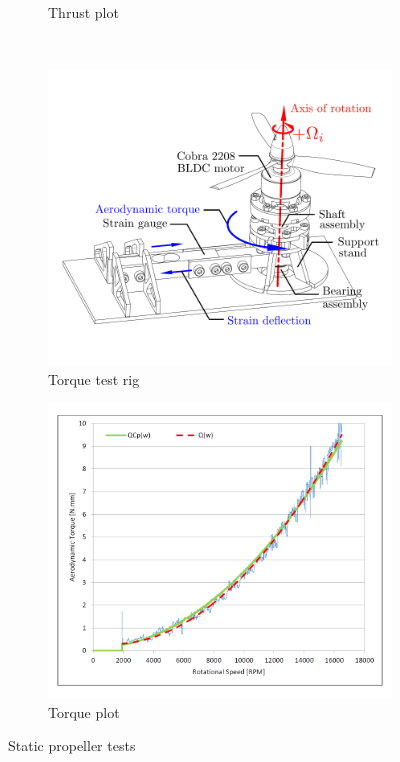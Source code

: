 \begin{figure}[htbp]
\begin{subfigure}{0.5\textwidth}
\caption{Thrust plot}
\label{fig:thrust-plot}
\end{subfigure}
\\
\begin{subfigure}{0.5\textwidth}
\centering
\includegraphics[width=\textwidth]{figs/torque-rig}
\caption{Torque test rig}
\label{fig:torque-rig}
\end{subfigure}
\begin{subfigure}{0.5\textwidth}
\centering
\includegraphics[width=\textwidth]{graphs/torque-plot}
\caption{Torque plot}
\label{fig:torque-plot}
\end{subfigure}
\caption{Static propeller tests}
\label{fig:propeller-plots}
\vspace{-20pt}
\end{figure}
